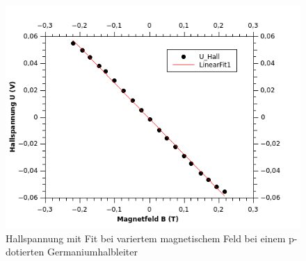 \documentclass[12pt,a4paper]{article}
\begin{document}
\begin{figure}[H]
	\centering
	\includegraphics[scale=1.3]{./figures/Hall_pGe_UH-B.png}
	\caption{Hallspannung mit Fit bei variertem magnetischem Feld bei einem p-dotierten Germaniumhalbleiter}
	\label{fig:pGe_UH_B}
\end{figure}
\end{document}
